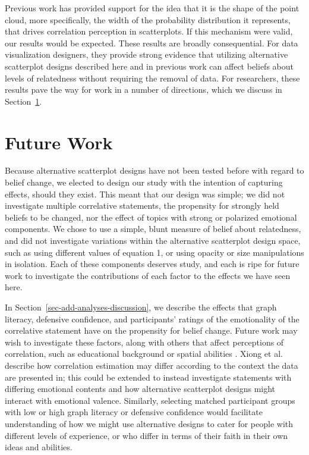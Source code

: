 \documentclass[manuscript,screen,review,anonymous]{acmart}
\providecommand{\DIFaddend}{} %
\DeclareRobustCommand{\DIFaddend}{\DIFOaddend \let\includegraphics\DIFOincludegraphics} %
\begin{document}
\DIFaddend Previous work has provided support for the idea that it is the shape of
the point cloud, more specifically, the width of the probability
distribution it represents, that drives correlation perception in
scatterplots. If this mechanism were valid, our results would be
expected. These results are broadly consequential. For data
visualization designers, they provide strong evidence that utilizing
alternative scatterplot designs described here and in previous work can
affect beliefs about levels of relatedness without requiring the removal
of data. For researchers, these results pave the way for work in a
number of directions, which we discuss in Section~\ref{sec-future-work}.

\section{Future Work}\label{sec-future-work}

Because alternative scatterplot designs have not been tested before with
regard to belief change, we elected to design our study with the
intention of capturing effects, should they exist. This meant that our
design was simple; we did not investigate multiple correlative
statements, the propensity for strongly held beliefs to be changed, nor
the effect of topics with strong or polarized emotional components. We
chose to use a simple, blunt measure of belief about relatedness, and
did not investigate variations within the alternative scatterplot design
space, such as using different values of equation 1, or using opacity or
size manipulations in isolation. Each of these components deserves
study, and each is ripe for future work to investigate the contributions
of each factor to the effects we have seen here.

In Section~\ref{sec-add-analyses-discussion}, we describe the effects
that graph literacy, defensive confidence, and participants' ratings of
the emotionality of the correlative statement have on the propensity for
belief change. Future work may wish to investigate these factors, along
with others that affect perceptions of correlation, such as educational
background or spatial abilities \citep{tandon_2024}. Xiong et al.
\citep{xiong_2022} describe how correlation estimation may differ
according to the context the data are presented in; this could be
extended to instead investigate statements with differing emotional
contents and how alternative scatterplot designs might interact with
emotional valence. Similarly, selecting matched participant groups with
low or high graph literacy or defensive confidence would facilitate
understanding of how we might use alternative designs to cater for
people with different levels of experience, or who differ in terms of
their faith in their own ideas and abilities.
\end{document}

